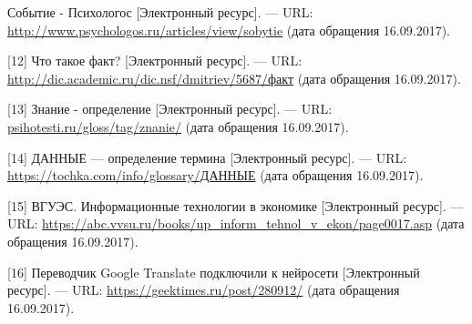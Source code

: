 \documentclass[14pt,a4paper,report]{report}
\begin{document}
\begin{flushleft}
[11] Событие - Психологос [Электронный ресурс]. — URL: \href{http://www.psychologos.ru/articles/view/sobytie}{http://www.psychologos.ru/articles/view/sobytie} (дата обращения 16.09.2017).

[12] Что такое факт? [Электронный ресурс]. — URL: \href{http://dic.academic.ru/dic.nsf/dmitriev/5687\%D1\%84\%D0\%B0\%D0\%BA\%D1\%82}{http://dic.academic.ru/dic.nsf/dmitriev/5687/факт} (дата обращения 16.09.2017).

[13] Знание - определение [Электронный ресурс]. — URL: \href{psihotesti.ru/gloss/tag/znanie/}{psihotesti.ru/gloss/tag/znanie/} (дата обращения 16.09.2017).

[14] ДАННЫЕ — определение термина [Электронный ресурс]. — URL: \href{https://tochka.com/info/glossary/\%D0\%94\%D0\%90\%D0\%9D\%D0\%9D\%D0\%AB\%D0\%95}{https://tochka.com/info/glossary/ДАННЫЕ} (дата обращения 16.09.2017).

[15] ВГУЭС. Информационные технологии в экономике [Электронный ресурс]. — URL: \href{https://abc.vvsu.ru/books/up_inform_tehnol_v_ekon/page0017.asp}{https://abc.vvsu.ru/books/up\_inform\_tehnol\_v\_ekon/page0017.asp} (дата обращения 16.09.2017).

[16] Переводчик Google Translate подключили к нейросети [Электронный ресурс]. — URL: \href{https://geektimes.ru/post/280912/}{https://geektimes.ru/post/280912/} (дата обращения 16.09.2017).

\end{flushleft}
	
\end{document}

